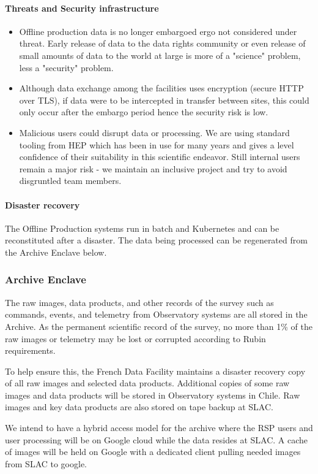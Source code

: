 \paragraph{ Threats and Security infrastructure}
\begin{itemize}
\item Offline production data is no longer embargoed ergo not considered under threat.  Early release of data to the data rights community or even release of small amounts of data to the world at large is more of a "science" problem, less a "security" problem.
\item Although data exchange among the facilities uses encryption (secure HTTP over TLS), if data were to be intercepted in transfer between sites, this could only occur after the embargo period hence the security risk is low.
\item Malicious users could disrupt data or processing.
We are using standard tooling from \gls{HEP} which has been in use for many years and gives a level confidence of their suitability in this scientific endeavor.
Still internal users remain a major risk - we maintain an inclusive project and try to avoid disgruntled team members.
\end{itemize}
\paragraph{Disaster recovery}
The Offline Production systems run in batch and Kubernetes and can be reconstituted after a disaster.
The data being processed can be regenerated from the Archive Enclave below.


\subsubsection{ \gls{Archive}  Enclave}
The raw images, data products, and other records of the survey such as commands, events, and telemetry from Observatory systems are all stored in the \gls{Archive}.
As the permanent scientific record of the survey, no more than 1\% of the raw images or telemetry may be lost or corrupted according to Rubin requirements.

To help ensure this, the French Data Facility maintains a disaster recovery copy of all raw images and selected data products. Additional copies of some raw images and data products will be stored in Observatory systems in Chile.  Raw images and key data products are also stored on tape backup at SLAC.

We intend to have a hybrid access model for the archive where  the \gls{RSP} users and user processing will be on Google cloud while the data resides at SLAC. A cache of images will be held on Google with a dedicated client pulling needed images from SLAC to google.


